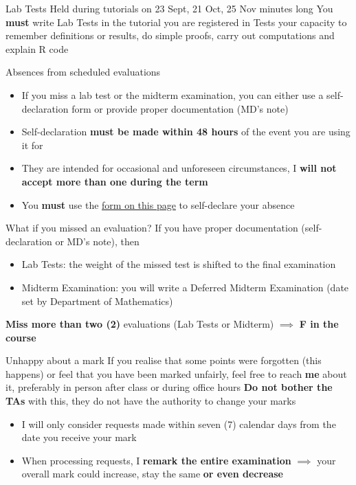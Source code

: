 \documentclass[aspectratio=169]{beamer}\usepackage[]{graphicx}\usepackage[]{xcolor}
\begin{document}
\begin{frame}{Lab Tests}
\bbullet Held during tutorials on 23 Sept, 21 Oct, 25 Nov
\vfill
{} minutes long 
\vfill
\bbullet You \textbf{must} write Lab Tests in the tutorial you are registered in
\vfill
\bbullet Tests your capacity to remember definitions or results, do simple proofs, carry out computations and explain R code
\end{frame}

\begin{frame}{Absences from scheduled evaluations}
\begin{itemize}
\item If you miss a lab test or the midterm examination, you can either use a self-declaration form or provide proper documentation (MD's note)
\vfill 
\item Self-declaration \textbf{must be made within 48 hours} of the event you are using it for
\vfill
\item They are intended for occasional and unforeseen circumstances, I \textbf{will not accept more than one during the term}
\vfill
\item You \textbf{must} use the \href{https://umanitoba.ca/student-supports/academic-supports/student-advocacy/self-declaration-policy-students}{form on this page} to self-declare your absence
\end{itemize}
\end{frame}

\begin{frame}{What if you missed an evaluation?}
If you have proper documentation (self-declaration or MD's note), then
\begin{itemize}
\item Lab Tests: the weight of the missed test is shifted to the final examination
\vfill
\item Midterm Examination: you will write a Deferred Midterm Examination (date set by Department of Mathematics)
\end{itemize}
\vfill
\alert{\textbf{Miss more than two (2)} evaluations (Lab Tests or Midterm) $\implies$ \textbf{F in the course}}
\end{frame}

\begin{frame}{Unhappy about a mark}
If you realise that some points were forgotten (this happens) or feel that you have been marked unfairly, feel free to reach \textbf{me} about it, preferably in person after class or during office hours
\vfill
\textbf{Do not bother the TAs} with this, they do not have the authority to change your marks
\vfill
\begin{itemize}
	\item I will only consider requests made within seven (7) calendar days from the date you receive your mark
	\vfill
	\item When processing requests, I \textbf{remark the entire examination}
	$\implies$ your overall mark could increase, stay the same \textbf{or even decrease}
\end{itemize}
\end{frame}
\end{document}
